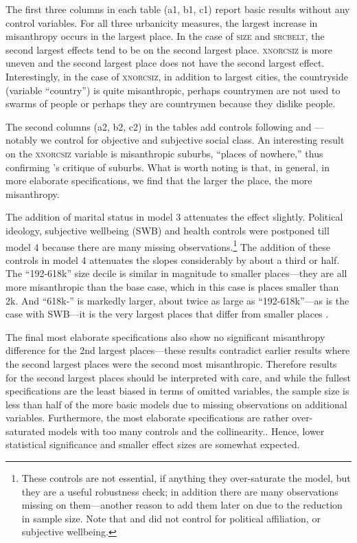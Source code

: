 \documentclass[11pt, letterpaper]{article}
\begin{document}
\begin{spacing}{1.4}
The first three columns in each table (a1, b1, c1) report basic results without any control variables. For all three
urbanicity measures, the largest increase in misanthropy occurs in the largest
place. In the case of \textsc{size} and \textsc{srcbelt}, the second largest effects
tend to be on the second largest place. \textsc{xnorcsiz} is more uneven and the
second largest place does not have the second largest effect. Interestingly, in
the case of \textsc{xnorcsiz}, in addition to largest cities,  the countryside (variable ``country'') is quite
misanthropic, perhaps countrymen are not used to swarms of people or perhaps they are countrymen because they dislike people. 

The second columns (a2, b2, c2) in the tables add controls following \citet{welch07} and \citet{smith97}---notably we control for objective and subjective social class. An interesting result on the \textsc{xnorcsiz} variable is misanthropic suburbs, ``places of nowhere,'' thus confirming \citet{kunstler12}'s critique of suburbs.
What is worth noting is that, in general, in more elaborate specifications, we find that the larger the place, the more misanthropy. 

The addition of marital status in model 3 attenuates the effect slightly. Political ideology, subjective wellbeing (SWB) and health controls were postponed till model 4 because there are many missing observations.\footnote{These controls are not essential, if anything they over-saturate the model, but they are a useful robustness check; in addition there are many observations missing on them---another reason to add them later on due to the reduction in sample size. Note that \citet{smith97} and \citet{wilson85} did not control for political affiliation, or subjective wellbeing.} 
The addition of these controls in model 4 attenuates the slopes considerably by about a third or half. The ``192-618k'' size decile is similar in magnitude to smaller places---they are all  more misanthropic than the base case, which in this case is places smaller than 2k. And ``618k-'' is markedly larger, about twice as large as ``192-618k''---as is the case with SWB---it is the very largest places that differ from smaller places \citep{aokCityBook15}. 

The final most elaborate specifications also show no significant misanthropy difference for the 2nd largest places---these results contradict earlier results where the second largest places were the second most misanthropic. Therefore results for the second largest places should be interpreted with care, and while the fullest specifications are the least biased in terms of omitted variables, the sample size is less than half of the more basic models due to missing observations on additional variables. Furthermore, the most elaborate specifications are rather over-saturated models with too many controls and the collinearity.. Hence, lower statistical significance and smaller effect sizes are somewhat expected. 


\end{spacing}
\end{document}
